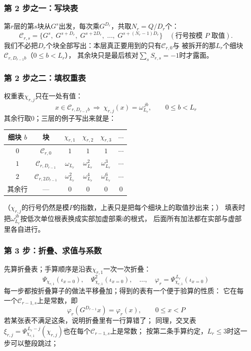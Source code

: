 \documentclass[UTF8,a4paper,11pt]{ctexart}
\newcommand{\ii}{\mathrm{i}}
\begin{document}
\subsubsection{第 2 步之一：写块表}
第$r$层的第$s$块从$G^s$出发，每次乘$G^{D_r}$，共取$N_r=Q/D_r$个：
\[
 \mathscr{C}_{r,s}=\bigl\{G^s,\;G^{s+D_r},\;G^{s+2D_r},\;\dots,\;G^{s+(N_r-1)D_r}\bigr\}
 \quad(\text{行号按模 }P\text{ 取值}).
\]
我们不必把$D_r$个块全部写出：本层真正要用到的只有$\mathscr{C}_{r,0}$与
被拆开的那$L_r$个细块$\mathscr{C}_{r,D_{r-1}b}$（$0\le b<L_r$），
其余块只是最后核对$\sum_sS_{r,s}=-1$时才露面。

\subsubsection{第 2 步之二：填权重表}
权重表$\chi_{r,j}$只在一处有值：
\[
 x\in\mathscr{C}_{r,D_{r-1}b}\ \Longrightarrow\ \chi_{r,j}(x)=\omega_{L_r}^{\,jb},
 \qquad 0\le b<L_r
\]
其余行取$0$；三层的例子写出来就是：
\begin{center}
\begin{tabular}{c|c|c|c|c|c}
\toprule
细块 $b$ & 块 & $\chi_{r,1}$ & $\chi_{r,2}$ & $\chi_{r,3}$ & $\cdots$ \\
\midrule
$0$ & $\mathscr{C}_{r,0}$ & $1$ & $1$ & $1$ & $\cdots$ \\
$1$ & $\mathscr{C}_{r,D_{r-1}}$ & $\omega_{L_r}$ & $\omega_{L_r}^{2}$ & $\omega_{L_r}^{3}$ & $\cdots$ \\
$2$ & $\mathscr{C}_{r,2D_{r-1}}$ & $\omega_{L_r}^{2}$ & $\omega_{L_r}^{4}$ & $\omega_{L_r}^{6}$ & $\cdots$ \\
其余行 & — & $0$ & $0$ & $0$ & $0$ \\
\bottomrule
\end{tabular}
\end{center}
（$\chi_{r,j}$的行号仍然是模$P$的指数，上表只是把每个细块上的取值抄出来；）
填表时把$\omega_{L_r}^{jb}$按低次单位根表换成实部加虚部乘$\ii$的根式，
后面所有加法都在实部与虚部里各自进行。

\subsubsection{第 3 步：折叠、求值与系数}
先算折叠表；手算顺序是沿表$\chi_{r,1}$一次一次折叠：
\[
 \Psi_{\chi_{r,1}}(\iota_{x=0}),\quad
 \Psi_{\chi_{r,1}}^{2}(\iota_{x=0}),\quad\dots,\quad
 \varphi_r=\Psi_{\chi_{r,1}}^{\,L_r}(\iota_{x=0})
\]
每一步都按折叠算子的做法平移叠加；得到的表有一个便于验算的性质：
它在每一个$\mathscr{C}_{r-1,s}$上是常数，即
\[
 \varphi_r(G^{D_{r-1}}x)=\varphi_r(x),\qquad 0\le x<P
\]
若某张表不满足这条，说明折叠里有一行算错了；
同理，交叉表$\xi_{r,j}=\Psi_{\chi_{r,1}}^{\,L_r-j}(\chi_{r,j})$也在每个$\mathscr{C}_{r-1,s}$上是常数；
按第二条手算约定，$L_r\le3$时这一步可以整段跳过；
\end{document}
